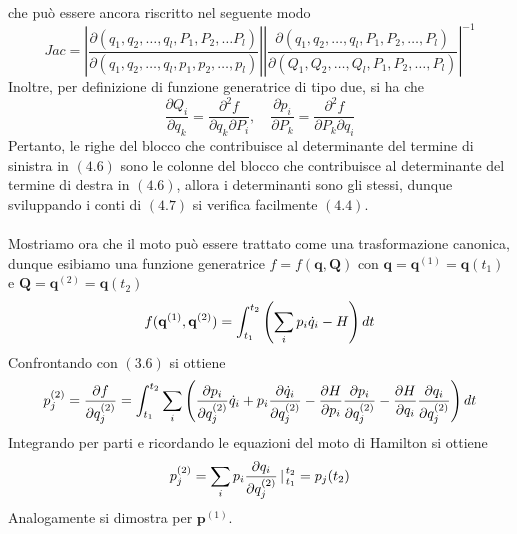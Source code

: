 \documentclass{article}
\begin{document}
che può essere ancora riscritto nel seguente modo
\begin{equation}
     Jac = \left| \frac{\partial(q_1, q_2, \dots, q_l, P_1, P_2, \dots P_l)}{\partial(q_1, q_2, \dots, q_l, p_1, p_2, \dots, p_l)} \right|\left| \frac{\partial(q_1, q_2, \dots, q_l, P_1, P_2, \dots, P_l)}{\partial(Q_1, Q_2, \dots, Q_l, P_1, P_2, \dots, P_l)} \right|^{-1} \tag{4.7}
\end{equation}
Inoltre, per definizione di funzione generatrice di tipo due, si ha che
\begin{equation}
    \frac{\partial Q_i}{\partial q_k} = \frac{\partial^2 f}{\partial q_k \partial P_i}, \quad \frac{\partial p_i}{\partial P_k} = \frac{\partial^2 f}{\partial P_k \partial q_i} \tag{4.8}
\end{equation}
Pertanto, le righe del blocco che contribuisce al determinante del termine di sinistra in $(4.6)$ sono le colonne del blocco che contribuisce al determinante del termine di destra in $(4.6)$, allora i determinanti sono gli stessi, dunque sviluppando i conti di $(4.7)$ si verifica facilmente $(4.4)$. \\ \\
Mostriamo ora che il moto può essere trattato come una trasformazione canonica, dunque esibiamo una funzione generatrice $f = f(\mathbf{q}, \mathbf{Q})$ con $\mathbf{q} = \mathbf{q}^{(1)} = \mathbf{q}(t_1)$ e $\mathbf{Q} = \mathbf{q}^{(2)} = \mathbf{q}(t_2)$
\begin{equation}
    f(\mathbf{q}^{(1)}, \mathbf{q}^{(2)}) = \int_{t_1}^{t_2} \left( \sum_i p_i \dot{q}_i - H \right) dt \notag
\end{equation}
Confrontando con $(3.6)$ si ottiene
\begin{equation}
    p^{(2)}_j = \frac{\partial f}{\partial q^{(2)}_j} =  \int_{t_1}^{t_2} \sum_i \left( \frac{\partial p_i}{\partial q^{(2)}_j}\dot{q}_i + p_i \frac{\partial \dot{q}_i}{\partial q^{(2)}_j} - \frac{\partial H}{\partial p_i}\frac{\partial p_i}{\partial q^{(2)}_j} - \frac{\partial H}{\partial q_i}\frac{\partial q_i}{\partial q^{(2)}_j} \right) dt \notag
\end{equation}
Integrando per parti e ricordando le equazioni del moto di Hamilton si ottiene
\begin{equation}
    p^{(2)}_j = \sum_i p_i \frac{\partial q_i}{\partial q^{(2)}_j} \left|\right._{t_1}^{t_2}  = p_j(t_2) \notag
\end{equation}
Analogamente si dimostra per $\mathbf{p}^{(1)}$.

\newpage
\end{document}
